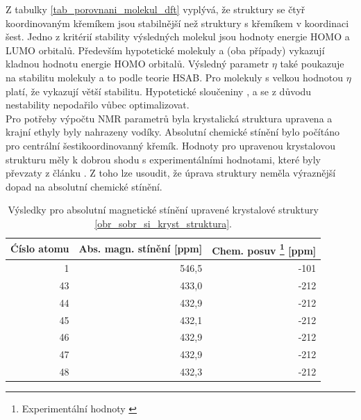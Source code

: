 \documentclass[
  digital, %
  table,   %
  lof,     %
  lot,     %
]{fithesis3}
\begin{document}
Z tabulky \ref{tab_porovnani_molekul_dft} vyplývá, že struktury se čtyř koordinovaným křemíkem jsou stabilnější než struktury s křemíkem v koordinaci šest. Jedno z kritérií stability výsledných molekul jsou hodnoty energie HOMO a LUMO orbitalů. Především hypotetické molekuly  a  (oba případy) vykazují kladnou hodnotu energie HOMO orbitalů. Výsledný parametr $\eta$ také poukazuje na stabilitu molekuly a to podle teorie HSAB. Pro molekuly s velkou hodnotou $\eta$ platí, že vykazují větší stabilitu. Hypotetické sloučeniny  ,  a  se z důvodu nestability nepodařilo vůbec optimalizovat. \\
Pro potřeby výpočtu NMR parametrů byla krystalická struktura upravena a krajní ethyly byly nahrazeny vodíky. Absolutní chemické stínění bylo počítáno pro centrální šestikoordinovanný křemík. Hodnoty pro upravenou krystalovou strukturu měly k dobrou shodu s experimentálními hodnotami, které byly převzaty z článku \cite{C3NJ00721A}. Z toho lze usoudit, že úprava struktury neměla výraznější dopad na absolutní chemické stínění. 

\begin{table}[htbp]
\begin{minipage}{\textwidth}
\caption{Výsledky pro absolutní magnetické stínění upravené krystalové struktury \ref{obr_sobr_si_kryst_struktura}.}
\begin{center}
\begin{tabular}{|r|r|r|}
\hline
\multicolumn{1}{|l|}{Ćíslo atomu} & \multicolumn{1}{l|}{Abs. magn. stínění [ppm]} & \multicolumn{1}{l|}{Chem. posuv \footnote{Experimentální hodnoty \cite{1316862}} [ppm]} \\ \hline
1 & 546,5 & -101 \\ \hline
43 & 433,0 & -212 \\ \hline
44 & 432,9 & -212 \\ \hline
45 & 432,1 & -212 \\ \hline
46 & 432,9 & -212 \\ \hline
47 & 432,9 & -212 \\ \hline
48 & 432,3 & -212 \\ \hline
\end{tabular}
\end{center}
\label{vysledky_abs_magn_stineni}
\end{minipage}
\end{table}

  
\end{document}
